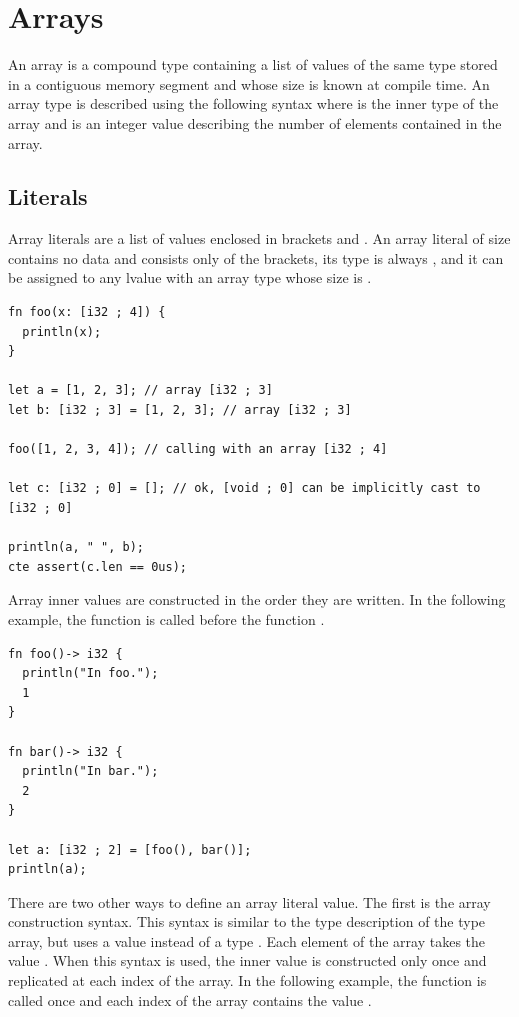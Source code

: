 \section{Arrays}%
\label{sec:compound:arrays}

 An array is a compound type containing a list of values of the same type stored
 in a contiguous memory segment and whose size is known at compile time. An
 array type is described using the following syntax \token{[T ; N]} where
  is the inner type of the array and  is an integer value
 describing the number of elements contained in the array.

\subsection{Literals}

Array literals are a list of values enclosed in brackets \token{[} and
  \token{]}. An array literal of size  contains no data and consists
only of the brackets, its type is always \token{[void ; 0]}, and it can be
assigned to any lvalue with an array type whose size is .

\begin{lstlisting}[style=coloredverbatim]
fn foo(x: [i32 ; 4]) {
  println(x);
}

let a = [1, 2, 3]; // array [i32 ; 3]
let b: [i32 ; 3] = [1, 2, 3]; // array [i32 ; 3]

foo([1, 2, 3, 4]); // calling with an array [i32 ; 4]

let c: [i32 ; 0] = []; // ok, [void ; 0] can be implicitly cast to [i32 ; 0]

println(a, " ", b);
cte assert(c.len == 0us);
\end{lstlisting}

Array inner values are constructed in the order they are written. In the
following example, the function  is called before the function
.

\begin{lstlisting}[style=coloredverbatim]
fn foo()-> i32 {
  println("In foo.");
  1
}

fn bar()-> i32 {
  println("In bar.");
  2
}

let a: [i32 ; 2] = [foo(), bar()];
println(a);
\end{lstlisting}

There are two other ways to define an array literal value. The first is the
array construction syntax. This syntax is similar to the type description of the
type array, but uses a value instead of a type \token{[V ; N]}. Each element of
the array takes the value . When this syntax is used, the inner value
is constructed only once and replicated at each index of the array. In the
following example, the function  is called once and each index of
the array contains the value .

